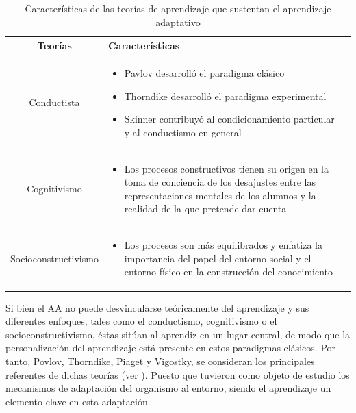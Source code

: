 \documentclass[spanish]{textolivre}
\begin{document}
\begin{table}[h!]
\caption{Características de las teorías de aprendizaje que sustentan el aprendizaje adaptativo} %
\centering %
\begin{tabular} { c      p{8cm}  p{4cm} } %
\hline %
Teorías & Características \\ [0.4ex] %
\hline %
Conductista & \begin{itemize}
    \item Pavlov desarrolló el paradigma clásico
    \item Thorndike desarrolló el paradigma experimental
    \item Skinner contribuyó al condicionamiento particular y al conductismo en general
\end{itemize} \\ %
Cognitivismo & \begin{itemize}
    \item Los procesos constructivos tienen su origen en la toma de conciencia de los desajustes entre las representaciones mentales de los alumnos y la realidad de la que pretende dar cuenta
\end{itemize} \\
Socioconstructivismo & \begin{itemize}
    \item Los procesos son más equilibrados y enfatiza la importancia del papel del entorno social y el entorno físico en la construcción del conocimiento
\end{itemize} \\
\hline %
\end{tabular}
\label{tbl01} %
\end{table}

Si bien el AA no puede desvincularse teóricamente del aprendizaje y sus diferentes enfoques, tales como el conductismo, cognitivismo o el socioconstructivismo, éstas sitúan al aprendiz en un lugar central, de modo que la personalización del aprendizaje está presente en estos paradigmas clásicos. Por tanto,
Povlov, Thorndike, Piaget y Vigostky, se consideran los
principales referentes de dichas teorías (ver ). Puesto que tuvieron como objeto de estudio los mecanismos de adaptación del organismo al entorno, siendo el aprendizaje un elemento clave en esta adaptación.
\end{document}
